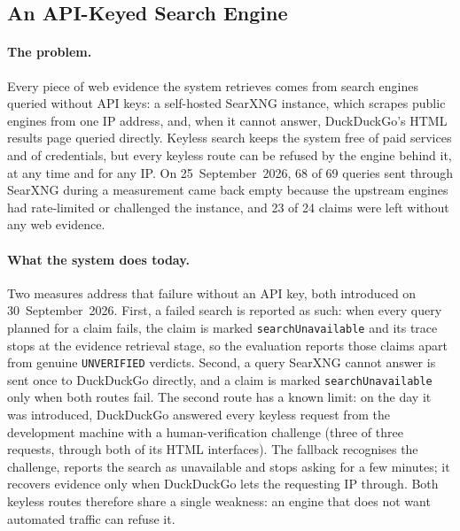 
\subsection{An API-Keyed Search Engine}
\label{subsec:future-keyed-search}

\paragraph{The problem.} Every piece of web evidence the system
retrieves comes from search engines queried without API keys: a
self-hosted SearXNG instance, which scrapes public engines from one IP
address, and, when it cannot answer, DuckDuckGo's HTML results page
queried directly. Keyless search keeps the system free of paid
services and of credentials, but every keyless route can be refused
by the engine behind it, at any time and for any IP. On
25~September~2026, 68 of 69 queries sent through SearXNG during a
measurement came back empty because the upstream engines had
rate-limited or challenged the instance, and 23 of 24 claims were left
without any web evidence.

\paragraph{What the system does today.} Two measures address that
failure without an API key, both introduced on 30~September~2026.
First, a failed search is reported as such: when every query planned
for a claim fails, the claim is marked \texttt{searchUnavailable} and
its trace stops at the evidence retrieval stage, so the evaluation
reports those claims apart from genuine \texttt{UNVERIFIED} verdicts.
Second, a query SearXNG cannot answer is sent once to DuckDuckGo
directly, and a claim is marked \texttt{searchUnavailable} only when
both routes fail. The second route has a known limit: on the day it
was introduced, DuckDuckGo answered every keyless request from the
development machine with a human-verification challenge (three of
three requests, through both of its HTML interfaces). The fallback
recognises the challenge, reports the search as unavailable and stops
asking for a few minutes; it recovers evidence only when DuckDuckGo
lets the requesting IP through. Both keyless routes therefore share a
single weakness: an engine that does not want automated traffic can
refuse it.

